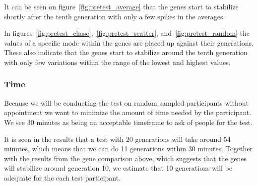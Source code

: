 It can be seen on figure~\ref{fig:pretest_average} that the genes start to stabilize shortly after the tenth generation with only a few spikes in the averages.

In figures~\ref{fig:pretest_chase},~\ref{fig:pretest_scatter}, and~\ref{fig:pretest_random} the values of a specific mode within the genes are placed up against their generations.
These also indicate that the genes start to stabilize around the tenth generation with only few variations within the range of the lowest and highest values.

\subsubsection*{Time}
Because we will be conducting the test on random sampled participants without appointment we want to minimize the amount of time needed by the participant.
We see 30 minutes as being an acceptable timeframe to ask of people for the test.

It is seen in the results that a test with 20 generations will take around 54 minutes, which means that we can do 11 generations within 30 minutes.
Together with the results from the gene comparison above, which suggests that the genes will stabilize around generation 10, we estimate that 10 generations will be adequate for the each test participant.